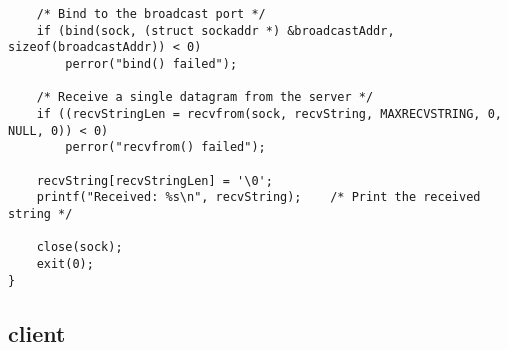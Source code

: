 \documentclass[12pt]{article}
\begin{document}
\begin{lstlisting}
    /* Bind to the broadcast port */
    if (bind(sock, (struct sockaddr *) &broadcastAddr, sizeof(broadcastAddr)) < 0)
        perror("bind() failed");

    /* Receive a single datagram from the server */
    if ((recvStringLen = recvfrom(sock, recvString, MAXRECVSTRING, 0, NULL, 0)) < 0)
        perror("recvfrom() failed");

    recvString[recvStringLen] = '\0';
    printf("Received: %s\n", recvString);    /* Print the received string */
    
    close(sock);
    exit(0);
}
\end{lstlisting}

\subsection{client}
\end{document}

